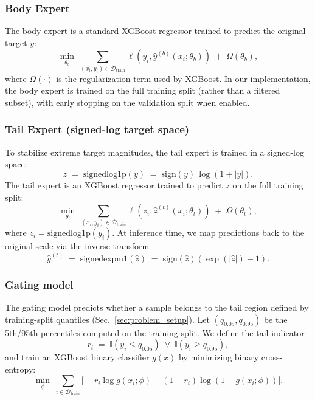 \documentclass[preprint,12pt]{elsarticle}
\begin{document}
\subsubsection{Body Expert}
The body expert is a standard XGBoost regressor trained to predict the original target $y$:
\begin{equation}
    \min_{\theta_b}\;\sum_{(x_i,y_i)\in\mathcal{D}_{\mathrm{train}}} 
    \ell\!\left(y_i,\hat{y}^{(b)}(x_i;\theta_b)\right) \;+\; \Omega(\theta_b),
\end{equation}
where $\Omega(\cdot)$ is the regularization term used by XGBoost. In our implementation, the body expert is trained on the full training split (rather than a filtered subset), with early stopping on the validation split when enabled.

\subsubsection{Tail Expert (signed-log target space)}
To stabilize extreme target magnitudes, the tail expert is trained in a signed-log space:
\begin{equation}
    z \;=\; \mathrm{signedlog1p}(y) \;=\; \mathrm{sign}(y)\,\log(1+|y|).
\end{equation}
The tail expert is an XGBoost regressor trained to predict $z$ on the full training split:
\begin{equation}
    \min_{\theta_t}\;\sum_{(x_i,y_i)\in\mathcal{D}_{\mathrm{train}}} 
    \ell\!\left(z_i,\hat{z}^{(t)}(x_i;\theta_t)\right) \;+\; \Omega(\theta_t),
\end{equation}
where $z_i=\mathrm{signedlog1p}(y_i)$. At inference time, we map predictions back to the original scale via the inverse transform
\begin{equation}
    \hat{y}^{(t)} \;=\; \mathrm{signedexpm1}(\hat{z}) \;=\; \mathrm{sign}(\hat{z})\left(\exp(|\hat{z}|)-1\right).
\end{equation}

\subsubsection{Gating model}
The gating model predicts whether a sample belongs to the tail region defined by training-split quantiles (Sec.~\ref{sec:problem_setup}). Let $(q_{0.05},q_{0.95})$ be the 5th/95th percentiles computed on the training split. We define the tail indicator
\begin{equation}
    r_i \;=\; \mathbb{I}\!\left(y_i \le q_{0.05}\right)\;\lor\;\mathbb{I}\!\left(y_i \ge q_{0.95}\right),
\end{equation}
and train an XGBoost binary classifier $g(x)$ by minimizing binary cross-entropy:
\begin{equation}
    \min_{\phi}\;\sum_{i\in\mathcal{D}_{\mathrm{train}}}
    \Big[-r_i\log g(x_i;\phi) - (1-r_i)\log(1-g(x_i;\phi))\Big].
\end{equation}
\end{document}
